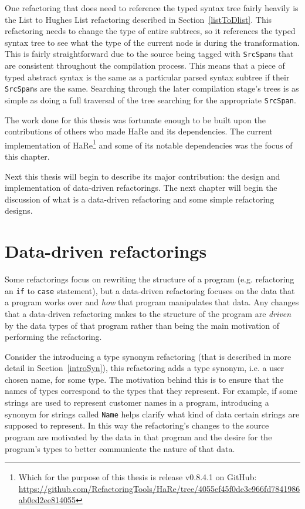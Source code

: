 One refactoring that does need to reference the typed syntax tree fairly heavily is the List to Hughes List refactoring described in Section~\ref{listToDlist}. This refactoring needs to change the type of entire subtrees, so it references the typed syntax tree to see what the type of the current node is during the transformation. This is fairly straightforward due to the source being tagged with \texttt{SrcSpan}s that are consistent throughout the compilation process. This means that a piece of typed abstract syntax is the same as a particular parsed syntax subtree if their \texttt{SrcSpan}s are the same. Searching through the later compilation stage's trees is as simple as doing a full traversal of the tree searching for the appropriate \texttt{SrcSpan}.

The work done for this thesis was fortunate enough to be built upon the contributions of others who made HaRe and its dependencies. The current implementation of HaRe\footnote{Which for the purpose of this thesis is release v0.8.4.1 on GitHub: \url{https://github.com/RefactoringTools/HaRe/tree/4055ef45f0de3c966fd7841986ab0ed2ee814055}} and some of its notable dependencies was the focus of this chapter.

Next this thesis will begin to describe its major contribution: the design and implementation of data-driven refactorings. The next chapter will begin the discussion of what is a data-driven refactoring and some simple refactoring designs.

\chapter{Data-driven refactorings}
\label{chp:ddRefs}

Some refactorings focus on rewriting the structure of a program (e.g. refactoring an \texttt{if} to \texttt{case} statement), but a data-driven refactoring focuses on the data that a program works over and \textit{how} that program manipulates that data. Any changes that a data-driven refactoring makes to the structure of the program are \textit{driven} by the data types of that program rather than being the main motivation of performing the refactoring. 

Consider the introducing a type synonym refactoring (that is described in  more detail in Section~\ref{introSyn}), this refactoring adds a type synonym, i.e. a user chosen name, for some type. The motivation behind this is to ensure that the names of types correspond to the types that they represent. For example, if some strings are used to represent customer names in a program, introducing a synonym for strings called \texttt{Name} helps clarify what kind of data certain strings are supposed to represent. In this way the refactoring's changes to the source program are motivated by the data in that program and the desire for the program's types to better communicate the nature of that data.

